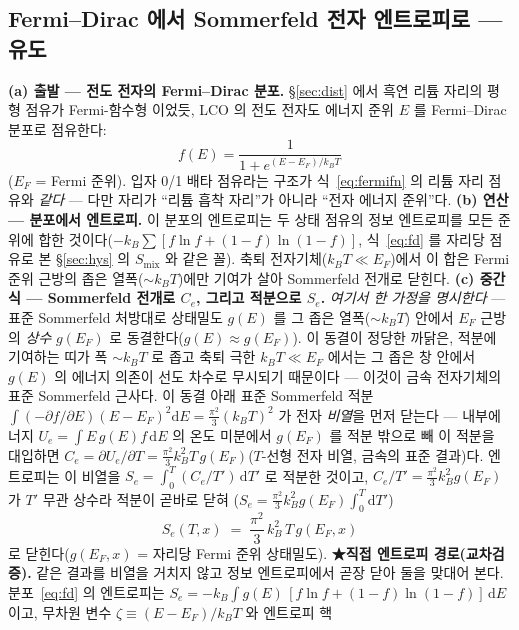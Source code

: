 \documentclass[11pt,a4paper]{article}
\newcommand{\dd}{\mathrm{d}}
\begin{document}
\subsection{Fermi--Dirac 에서 Sommerfeld 전자 엔트로피로 — 유도}\label{sec:lco-Se}
\textbf{(a) 출발 — 전도 전자의 Fermi--Dirac 분포.} \S\ref{sec:dist} 에서 흑연 리튬 자리의 평형 점유가 Fermi-함수형
이었듯, LCO 의 전도 전자도 에너지 준위 $E$ 를 Fermi--Dirac 분포로 점유한다:
\begin{equation}
f(E)=\frac{1}{1+e^{(E-E_F)/k_BT}}
\label{eq:fd}
\end{equation}
($E_F$ = Fermi 준위). 입자 0/1 배타 점유라는 구조가 식~\eqref{eq:fermifn} 의 리튬 자리 점유와 \emph{같다} — 다만 자리가
``리튬 흡착 자리''가 아니라 ``전자 에너지 준위''다. \textbf{(b) 연산 — 분포에서 엔트로피.} 이 분포의 엔트로피는 두 상태
점유의 정보 엔트로피를 모든 준위에 합한 것이다($-k_B\sum[f\ln f+(1-f)\ln(1-f)]$, 식~\eqref{eq:fd} 를 자리당 점유로 본
\S\ref{sec:hys} 의 $S_\mathrm{mix}$ 와 같은 꼴). 축퇴 전자기체($k_BT\!\ll\!E_F$)에서 이 합은 Fermi 준위 근방의 좁은
열폭($\sim k_BT$)에만 기여가 살아 Sommerfeld 전개로 닫힌다. \textbf{(c) 중간식 — Sommerfeld 전개로 $C_e$, 그리고 적분으로 $S_e$.}
\emph{여기서 한 가정을 명시한다} — 표준 Sommerfeld 처방대로 상태밀도 $g(E)$ 를 그 좁은 열폭($\sim k_BT$) 안에서
$E_F$ 근방의 \emph{상수} $g(E_F)$ 로 동결한다($g(E)\approx g(E_F)$). 이 동결이 정당한 까닭은, 적분에 기여하는 띠가
폭 $\sim k_BT$ 로 좁고 축퇴 극한 $k_BT\!\ll\!E_F$ 에서는 그 좁은 창 안에서 $g(E)$ 의 에너지 의존이 선도 차수로
무시되기 때문이다 — 이것이 금속 전자기체의 표준 Sommerfeld 근사다. 이 동결 아래 표준 Sommerfeld 적분
$\int(-\partial f/\partial E)(E-E_F)^2\dd E=\tfrac{\pi^2}{3}(k_BT)^2$ 가
전자 \emph{비열}을 먼저 닫는다 — 내부에너지 $U_e=\int E\,g(E)f\,\dd E$ 의 온도 미분에서 $g(E_F)$ 를 적분 밖으로 빼
이 적분을 대입하면
$C_e=\partial U_e/\partial T=\tfrac{\pi^2}{3}k_B^2T\,g(E_F)$($T$-선형 전자 비열, 금속의 표준 결과)다. 엔트로피는 이
비열을 $S_e=\int_0^T (C_e/T')\,\dd T'$ 로 적분한 것이고, $C_e/T'=\tfrac{\pi^2}{3}k_B^2g(E_F)$ 가 $T'$ 무관 상수라
적분이 곧바로 닫혀 ($S_e=\tfrac{\pi^2}{3}k_B^2 g(E_F)\int_0^T\dd T'$)
\begin{equation}
S_e(T,x)\;=\;\frac{\pi^2}{3}\,k_B^2\,T\,g(E_F,x)
\label{eq:Se}
\end{equation}
로 닫힌다($g(E_F,x)$ = 자리당 Fermi 준위 상태밀도). \textbf{★직접 엔트로피 경로(교차검증).} 같은 결과를 비열을
거치지 않고 정보 엔트로피에서 곧장 닫아 둘을 맞대어 본다. 분포~\eqref{eq:fd} 의 엔트로피는
$S_e=-k_B\int g(E)\,[f\ln f+(1-f)\ln(1-f)]\,\dd E$ 이고, 무차원 변수 $\zeta\equiv(E-E_F)/k_BT$ 와 엔트로피 핵
\end{document}

